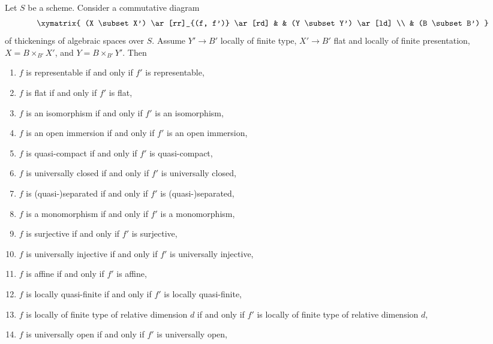 \begin{lemma}
\label{lemma-deform-property-fp-over-ft}
Let $S$ be a scheme. Consider a commutative diagram
$$
\xymatrix{
(X \subset X') \ar[rr]_{(f, f')} \ar[rd] & & (Y \subset Y') \ar[ld] \\
& (B \subset B')
}
$$
of thickenings of algebraic spaces over $S$.
Assume $Y' \to B'$ locally of finite type,
$X' \to B'$ flat and locally of finite presentation,
$X = B \times_{B'} X'$, and $Y = B \times_{B'} Y'$. Then
\begin{enumerate}
\item $f$ is representable if and only if $f'$ is representable,
\label{item-representable-fp-over-ft}
\item $f$ is flat if and only if $f'$ is flat,
\label{item-flat-fp-over-ft}
\item $f$ is an isomorphism if and only if $f'$ is an isomorphism,
\label{item-isomorphism-fp-over-ft}
\item $f$ is an open immersion if and only if $f'$ is an open immersion,
\label{item-open-immersion-fp-over-ft}
\item $f$ is quasi-compact if and only if $f'$ is quasi-compact,
\label{item-quasi-compact-fp-over-ft}
\item $f$ is universally closed if and only if $f'$ is universally closed,
\label{item-universally-closed-fp-over-ft}
\item $f$ is (quasi-)separated if and only if $f'$ is (quasi-)separated,
\label{item-separated-fp-over-ft}
\item $f$ is a monomorphism if and only if $f'$ is a monomorphism,
\label{item-monomorphism-fp-over-ft}
\item $f$ is surjective if and only if $f'$ is surjective,
\label{item-surjective-fp-over-ft}
\item $f$ is universally injective if and only if $f'$ is universally injective,
\label{item-universally-injective-fp-over-ft}
\item $f$ is affine if and only if $f'$ is affine,
\label{item-affine-fp-over-ft}
\item $f$ is locally quasi-finite if and only if $f'$ is locally quasi-finite,
\label{item-quasi-finite-fp-over-ft}
\item
\label{item-relative-dimension-d-fp-over-ft}
$f$ is locally of finite type of relative dimension $d$ if and only if
$f'$ is locally of finite type of relative dimension $d$,
\item $f$ is universally open if and only if $f'$ is universally open,

\end{enumerate}
\end{lemma}
